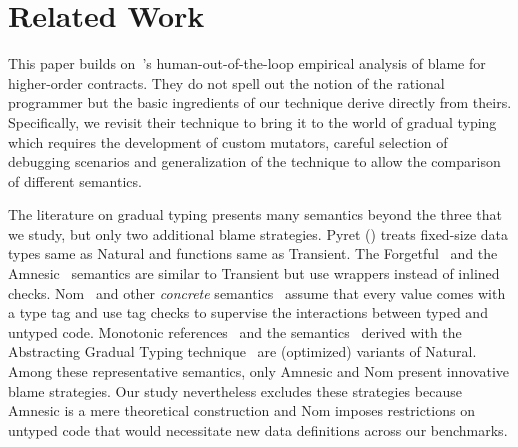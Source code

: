 \section{Related Work}
\label{sec:related}

This paper builds on~\citet{lksfd-popl-2020}'s human-out-of-the-loop
empirical analysis of
blame for higher-order contracts. They do not spell out the notion of the
rational programmer but the basic ingredients of our technique derive
directly from theirs. Specifically, we revisit their  technique
to bring it to the world of gradual typing which requires the development of custom mutators,
careful selection of debugging scenarios and generalization of the
technique to allow the comparison of different semantics.

The literature on gradual typing presents many semantics beyond the three
that we study, but only two additional blame strategies.
Pyret () treats fixed-size data types same as Natural
and functions same as Transient. The Forgetful~\cite{cl-icfp-2017} and
the Amnesic~\cite{gfd-oopsla-2019} semantics are similar to Transient but
use wrappers instead of inlined checks.  Nom~\cite{mt-oopsla-2017} and
other \emph{concrete\/} semantics~\cite{wnlov-popl-2010, rsfbv-popl-2015,
rzv-ecoop-2015, rat-oopsla-2017} assume that every value comes with a type tag
and use tag checks to supervise the interactions between typed and untyped code.
Monotonic
references~\cite{svctg-esop-2015} and the semantics~\cite{tlt-popl-2019,
etg-icfp-19, tt-scp-20, tgt-popl-18, tt-sas-17} derived with the
Abstracting Gradual Typing
technique~\cite{gct-popl-2016} are (optimized) variants of Natural.
Among these representative semantics, only Amnesic and Nom present innovative
blame strategies.
Our study nevertheless excludes these strategies because Amnesic is a mere
theoretical construction and Nom imposes restrictions on untyped
code that would necessitate new data definitions across our benchmarks.
 
